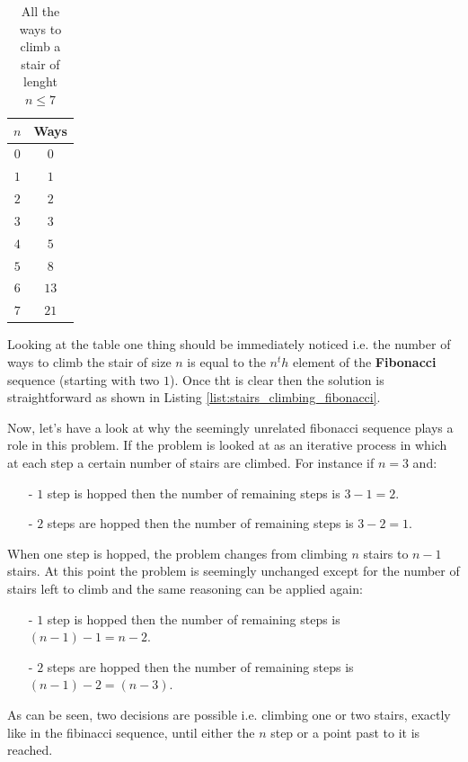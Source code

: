 \begin{table}
	\centering
	\begin{tabular}{|c|c|}
		\hline
		$n$ & \textbf{Ways} \\ \hline
		$0$ & $0$ \\ \hline
		$1$ & $1$ \\ \hline
		$2$ & $2$ \\ \hline
		$3$ & $3$ \\ \hline
		$4$ & $5$ \\ \hline
		$5$ & $8$ \\ \hline
		$6$ & $13$ \\ \hline
		$7$ & $21$ \\ \hline
	\end{tabular}
\label{tab:stairs_climbing_ways_up_tp_7}
\caption{All the ways to climb a stair of lenght $n \leq 7$ }
\end{table}

Looking at the table one thing should be immediately noticed i.e. the number of ways to climb the stair of size $n$ is equal to the $n^th$ element of the \textbf{Fibonacci} sequence (starting with two $1$).
Once tht is clear then the solution is straightforward as shown in Listing \ref{list:stairs_climbing_fibonacci}.



Now, let's have a look at why the seemingly unrelated fibonacci sequence plays a role in this problem. If the problem is looked at as an iterative process in which at each step a certain number of stairs are climbed. For instance if $n = 3$ and:
\begin{itemize}
	\item[-] $1$ step is hopped then the number of remaining steps is $3-1 = 2$. 
	\item[-] $2$ steps are hopped then the number of remaining steps is $3-2 = 1$.
\end{itemize}
When one step is hopped, the problem changes from climbing $n$ stairs to $n-1$ stairs. At this point the problem is seemingly unchanged except for the number of stairs left to climb and the same reasoning can be applied again:
\begin{itemize}
	\item[-] $1$ step is hopped then the number of remaining steps is $(n-1)-1 = n-2$. 
	\item[-] $2$ steps are hopped then the number of remaining steps is $(n-1)-2 = (n-3)$.
\end{itemize}
As can be seen, two decisions are possible i.e. climbing one or two stairs, exactly like in the fibinacci sequence, until either the $n$ step or a point past to it is reached.

